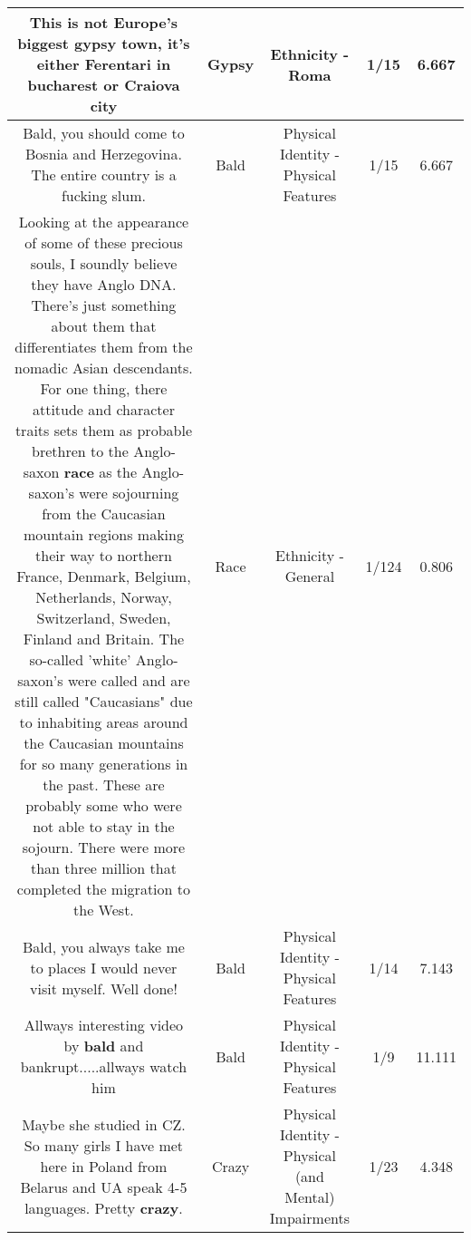 \documentclass[11pt]{article}
\newlength\mylength
\begin{document}
\begin{center}
\begin{longtable}{|C{.65\mylength}|C{.30\mylength}|C{.12\mylength}|C{.12\mylength}|C{.12\mylength}|}
  \small This is not Europe's biggest \textbf{gypsy} town, it's either Ferentari in bucharest or Craiova city\normalsize   & Gypsy & Ethnicity - Roma & 1/15 & 6.667 \\  \hline
  \small Bald, you should come to Bosnia and Herzegovina. The entire country is a fucking slum.\normalsize   & Bald & Physical Identity - Physical Features & 1/15 & 6.667 \\  \hline
  \small Looking at the appearance of some of these precious souls, I soundly believe they have Anglo DNA.   There's just something about them that differentiates them from the nomadic Asian descendants.  For one thing, there attitude and character traits sets them as probable brethren to the Anglo-saxon \textbf{race} as the Anglo-saxon's were sojourning from the Caucasian mountain regions making their way to northern France, Denmark, Belgium,  Netherlands, Norway, Switzerland, Sweden, Finland and Britain.   The so-called 'white' Anglo-saxon's were called and are still called "Caucasians" due to inhabiting areas around the Caucasian mountains for so many generations in the past.  These are probably some who were not able to stay in the sojourn.  There were more than three million that completed the migration to the West.\normalsize   & Race & Ethnicity - General & 1/124 & 0.806 \\  \hline
  \small Bald, you always take me to places I would never visit myself.  Well done!\normalsize   & Bald & Physical Identity - Physical Features & 1/14 & 7.143 \\  \hline
  \small Allways interesting video by \textbf{bald} and bankrupt.....allways watch him\normalsize   & Bald & Physical Identity - Physical Features & 1/9 & 11.111 \\  \hline
  \small Maybe she studied in CZ.  So many girls I have met here in Poland from Belarus and UA speak 4-5 languages.  Pretty \textbf{crazy}.\normalsize   & Crazy & Physical Identity - Physical (and Mental) Impairments & 1/23 & 4.348 \\  \hline

\end{longtable}
\end{center}
\end{document}

